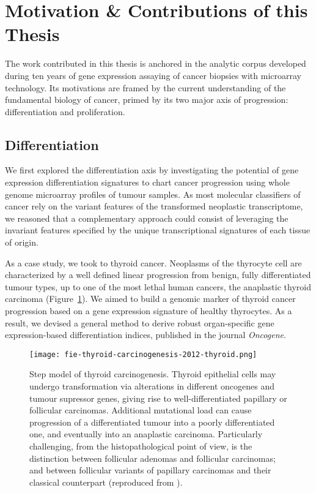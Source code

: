 \section{Motivation \& Contributions of this Thesis}

The work contributed in this thesis is anchored in the analytic corpus developed
during ten years of gene expression assaying of cancer biopsies with
microarray technology.  Its motivations are framed by the current understanding
of the fundamental biology of cancer, primed by its two major axis of
progression: differentiation and proliferation.

\subsection{Differentiation}
We first explored the differentiation axis by investigating the potential of
gene expression differentiation signatures to chart cancer progression using
whole genome microarray profiles of tumour samples.  As most molecular
classifiers of cancer rely on the variant features of the transformed neoplastic
transcriptome, we reasoned that a complementary approach could consist of
leveraging the invariant features specified by the unique transcriptional
signatures of each tissue of origin.

As a case study, we took to thyroid cancer.  Neoplasms of the thyrocyte cell are
characterized by a well defined linear progression from benign, fully
differentiated tumour types, up to one of the most lethal human cancers, the
anaplastic thyroid carcinoma (Figure~\ref{fig:thyroid-carcinogenesis}).  We
aimed to build a genomic marker of thyroid cancer progression based on a gene
expression signature of healthy thyrocytes.  As a result, we devised a general
method to derive robust \mbox{organ-specific} gene \mbox{expression-based}
differentiation indices, published in the journal
\emph{Oncogene}.\cite{tomas_general_2012}

\begin{figure}[ht]
  \texttt{[image: fie-thyroid-carcinogenesis-2012-thyroid.png]}%
  \caption{Step model of thyroid carcinogenesis.  Thyroid epithelial cells may
    undergo transformation via alterations in different oncogenes and tumour
    supressor genes, giving rise to \mbox{well-differentiated} papillary or
    follicular carcinomas.  Additional mutational load can cause progression of
    a differentiated tumour into a poorly differentiated one, and eventually
    into an anaplastic carcinoma.  Particularly challenging, from the
    histopathological point of view, is the distinction between follicular
    adenomas and follicular carcinomas; and between follicular variants of
    papillary carcinomas and their classical counterpart (reproduced from
    \citealp{sastre-perona_role_2012}).}
  \label{fig:thyroid-carcinogenesis}
\end{figure}

